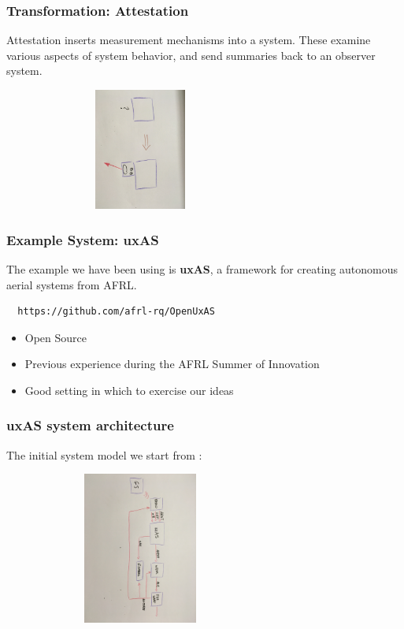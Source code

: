 \documentclass{beamer}
\begin{document}
\begin{frame}\frametitle{Transformation: Attestation}

Attestation inserts measurement mechanisms into a system. These
examine various aspects of system behavior, and send summaries back to
an observer system.

\hspace*{10mm}\includegraphics[width=90mm,height=40mm]{att.jpg}

\end{frame}

\begin{frame}[fragile]\frametitle{Example System: uxAS}

 The example we have been using is \textbf{uxAS}, a framework for
 creating autonomous aerial systems from AFRL.

\begin{verbatim}
  https://github.com/afrl-rq/OpenUxAS
\end{verbatim}

\begin{itemize}
\item Open Source
\item Previous experience during the AFRL Summer of Innovation
\item Good setting in which to exercise our ideas
\end{itemize}

\end{frame}

\begin{frame}\frametitle{uxAS system architecture}

The initial system model we start from :

  \includegraphics[width=90mm,height=50mm]{uxas-orig.jpg}


\end{frame}
\end{document}
